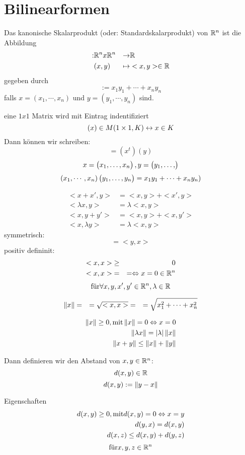 \section{Bilinearformen}
Das kanonische Skalarprodukt (oder: Standardskalarprodukt) von $\mathbb{R}^n$ ist die Abbildung
\begin{align*}<,>: & \mb{R}^nx\mb{R}^n & \to & \mb{R}\\
 & (x,y) & \mapsto & <x,y>\in\mb{R}
\end{align*}
gegeben durch
\[<x,y>:=x_1y_1+\cdots+x_ny_n\]
falls $x=(x_1,\cdots,x_n)$ und $y=(y_1,\cdots,y_n)$ sind.
\begin{Def}[Konvention]
eine $1x1$ Matrix wird mit Eintrag indentifiziert
\[(x)\in{}M(1\times 1,K) \leftrightarrow x\in{}K\]
Dann können wir schreiben:
\[<x,y>=(x^t)(y)\]
\[x=\begin{pmatrix}x_1,\hdots,x_n\end{pmatrix}, y=\begin{pmatrix}y_1,\hdots,\end{pmatrix}\]
\[(x_1,\cdots,x_n)\begin{pmatrix}y_1,\hdots,y_n\end{pmatrix}=x_1y_1+\cdots+x_ny_n)\]
\end{Def}
\begin{Bem}
\begin{align*}
  <x+x',y>&=<x,y>+<x',y>\\
  <\lambda{}x,y>&=\lambda<x,y>\\
  <x,y+y'>&=<x,y>+<x,y'>\\
  <x,\lambda{}y>&=\lambda<x,y>
\end{align*}
symmetrisch:
\[<x,y>=<y,x>\]
positiv defininit:
\begin{align*}
  <x,x> &\geq& 0 \\
  <x,x> &=&= \Leftrightarrow x=0\in\mathbb{R}^n
\end{align*}
\[\text{für} \forall x,y,x',y'\in\mathbb{R}^n, \lambda\in\mathbb{R}\]
\end{Bem}
\begin{Bem}
\begin{align*}
  \left\| x \right\|&=&=\sqrt{<x,x>}
  &=&=\sqrt{x^2_1+\cdots+x_n^2}
\end{align*}
\end{Bem}
\begin{Bem}
\begin{align*}
  \left\| x \right\|\geq0, \text{mit} \left\| x \right\|=0 \Leftrightarrow x=0\\
  \left\| \lambda{}x \right\|=\left| \lambda \right|\left\| x \right\|\\
  \left\| x+y \right\|\leq\left\| x \right\|+\left\| y \right\|
\end{align*}
\end{Bem}
Dann definieren wir den Abstand von $x,y\in\mathbb{R}^n$:
\[d(x,y)\in\mathbb{R}\]
\[d(x,y):=\left\| y-x \right\|\]
\begin{Bem}{Eigenschaften}
\begin{align*}
  d(x,y)\geq0, \text{mit}d(x,y)=0 \Leftrightarrow x=y\\
  d(y,x)=d(x,y)\\
  d(x,z)\leq d(x,y)+d(y,z)
\end{align*}
\[\text{für} x,y,z\in\mathbb{R}^n\]
\end{Bem}
